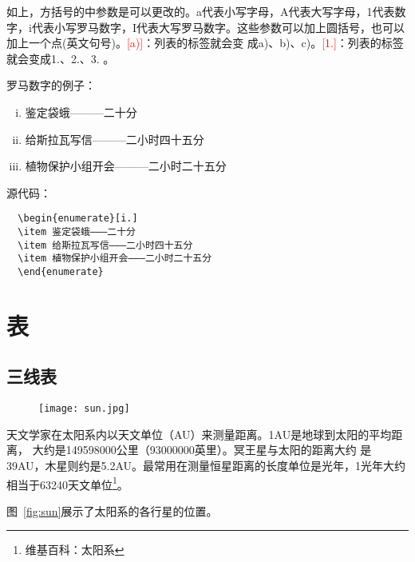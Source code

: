 如上，方括号的中参数是可以更改的。a代表小写字母，A代表大写字母，1代表数
字，i代表小写罗马数字，I代表大写罗马数字。这些参数可以加上圆括号，也可以
加上一个点(英文句号)。\textcolor{red}{[a)]}：列表的标签就会变
成a)、b)、c)。\textcolor{red}{[1.]}：列表的标签就会变成1.、2.、3. 。

罗马数字的例子：
\begin{enumerate}[i.]
\item 鉴定袋蛾———二十分
\item 给斯拉瓦写信———二小时四十五分
\item 植物保护小组开会———二小时二十五分
\end{enumerate}
源代码：
\begin{lstlisting}
  \begin{enumerate}[i.]
  \item 鉴定袋蛾———二十分
  \item 给斯拉瓦写信———二小时四十五分
  \item 植物保护小组开会———二小时二十五分
  \end{enumerate}
\end{lstlisting}

\section{表}

\subsection{三线表}

\begin{figure}[htbp]
  \centering
  \texttt{[image: sun.jpg]}
  \vspace{0.2cm}
\end{figure}

天文学家在太阳系内以天文单位（AU）来测量距离。1AU是地球到太阳的平均距离，
大约是\num{149598000}公里（\num{93000000}英里）。冥王星与太阳的距离大约
是39AU，木星则约是5.2AU。最常用在测量恒星距离的长度单位是光年，1光年大约
相当于\num{63240}天文单位\footnote{维基百科：太阳系}。

图~\ref{fig:sun}展示了太阳系的各行星的位置。

